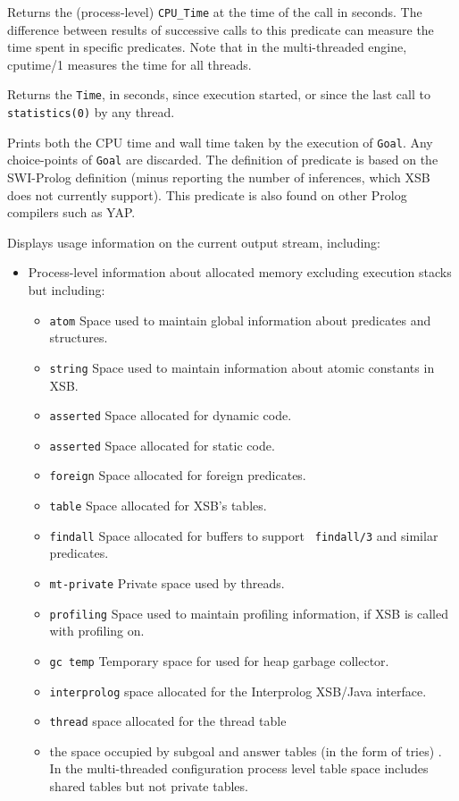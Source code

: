 \begin{description}
%
Returns the (process-level) {\tt CPU\_Time} at the time of the call in
seconds.  The difference between results of successive calls to this
predicate can measure the time spent in specific predicates.  Note
that in the multi-threaded engine, {cputime/1} measures the time for
all threads.

%
Returns the \texttt{Time}, in seconds, since execution started, or
since the last call to \texttt{statistics(0)} by any thread.

%
Prints both the CPU time and wall time taken by the execution of \texttt{Goal}.
Any choice-points of \texttt{Goal} are discarded. The definition of predicate is based 
on the SWI-Prolog definition (minus reporting the number of inferences, which XSB does 
not currently support). This predicate is also found on other Prolog compilers such as YAP.

%
Displays usage information on the current output stream, including: 
\begin{itemize} 
\item Process-level information about allocated memory excluding
  execution stacks but including: 
\begin{itemize}
\item {\tt atom} Space used to maintain global information about
  predicates and structures. 
%
\item {\tt string} Space used to maintain information about atomic
  constants in XSB.
%
\item {\tt asserted} Space allocated for dynamic code.
%
\item {\tt asserted} Space allocated for static code.
%
\item {\tt foreign} Space allocated for foreign predicates.
%
\item {\tt table} Space allocated for XSB's tables.
%
\item {\tt findall} Space allocated for buffers to support {\tt
  findall/3} and similar predicates.
%
\item {\tt mt-private} Private space used by threads.
%
\item {\tt profiling} Space used to maintain profiling information, if
  XSB is called with profiling on.
%
\item {\tt gc temp} Temporary space for used for heap garbage
  collector.
%
\item {\tt interprolog} space allocated for the Interprolog XSB/Java
  interface.
%
\item {\tt thread} space allocated for the thread table
%
\item the space occupied by subgoal and answer tables (in the form of
  tries) \cite{RRSSW98,CuSW99b,TST99}.  In the multi-threaded
  configuration process level table space includes shared tables but
  not private tables.
\end{itemize}


\end{itemize}
\end{description}
